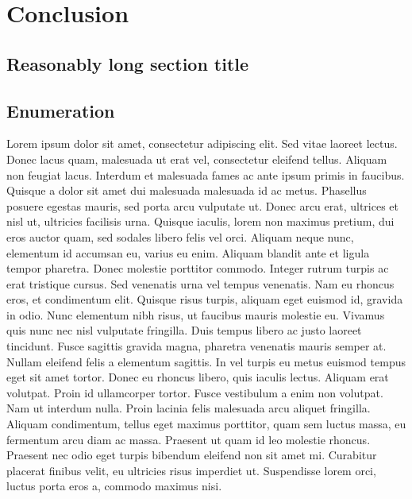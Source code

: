 
\chapter{Conclusion}

\ifpdf
    \graphicspath{{Chapter6/Figs/Raster/}{Chapter6/Figs/PDF/}{Chapter6/Figs/}}
\else
    \graphicspath{{Chapter6/Figs/Vector/}{Chapter6/Figs/}}
\fi


\section[Short title]{Reasonably long section title}



\section*{Enumeration}
Lorem ipsum dolor sit amet, consectetur adipiscing elit. Sed vitae laoreet lectus.
Donec lacus quam, malesuada ut erat vel, consectetur eleifend tellus. Aliquam non
feugiat lacus. Interdum et malesuada fames ac ante ipsum primis in faucibus.
Quisque a dolor sit amet dui malesuada malesuada id ac metus. Phasellus posuere
egestas mauris, sed porta arcu vulputate ut. Donec arcu erat, ultrices et nisl ut,
ultricies facilisis urna. Quisque iaculis, lorem non maximus pretium, dui eros
auctor quam, sed sodales libero felis vel orci. Aliquam neque nunc, elementum id
accumsan eu, varius eu enim. Aliquam blandit ante et ligula tempor pharetra.
Donec molestie porttitor commodo. Integer rutrum turpis ac erat tristique cursus.
Sed venenatis urna vel tempus venenatis. Nam eu rhoncus eros, et condimentum elit.
Quisque risus turpis, aliquam eget euismod id, gravida in odio. Nunc elementum
nibh risus, ut faucibus mauris molestie eu.
Vivamus quis nunc nec nisl vulputate fringilla. Duis tempus libero ac justo
laoreet tincidunt. Fusce sagittis gravida magna, pharetra venenatis mauris
semper at. Nullam eleifend felis a elementum sagittis. In vel turpis eu metus
euismod tempus eget sit amet tortor. Donec eu rhoncus libero, quis iaculis lectus.
Aliquam erat volutpat. Proin id ullamcorper tortor. Fusce vestibulum a enim non
volutpat. Nam ut interdum nulla. Proin lacinia felis malesuada arcu aliquet fringilla.
Aliquam condimentum, tellus eget maximus porttitor, quam sem luctus massa,
eu fermentum arcu diam ac massa. Praesent ut quam id leo molestie rhoncus.
Praesent nec odio eget turpis bibendum eleifend non sit amet mi. Curabitur placerat
finibus velit, eu ultricies risus imperdiet ut. Suspendisse lorem orci, luctus
porta eros a, commodo maximus nisi.

